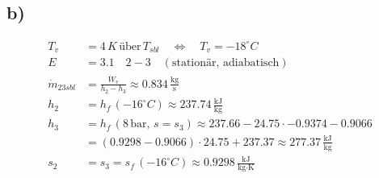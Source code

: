 

\subsection*{b)}

\begin{align*}
    T_v &= 4 \, K \, \text{über} \, T_{sbl} \quad \Leftrightarrow \quad T_v = -18^\circ C \\
    E &= 3.1 \quad 2-3 \quad (\text{stationär, adiabatisch}) \\
    \dot{m}_{23sbl} &= \frac{\dot{W}_v}{h_2 - h_3} \approx 0.834 \, \frac{\text{kg}}{\text{s}} \\
    h_2 &= h_f \, (-16^\circ C) \approx 237.74 \, \frac{\text{kJ}}{\text{kg}} \\
    h_3 &= h_f \, (8 \, \text{bar}, \, s = s_3) \approx 237.66 - 24.75 \cdot -0.9374 - 0.9066 \\
    &= (0.9298 - 0.9066) \cdot 24.75 + 237.37 \approx 277.37 \, \frac{\text{kJ}}{\text{kg}} \\
    s_2 &= s_3 = s_f \, (-16^\circ C) \approx 0.9298 \, \frac{\text{kJ}}{\text{kg} \cdot \text{K}}
\end{align*}